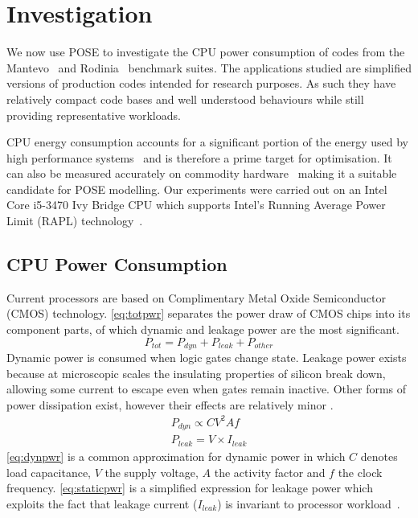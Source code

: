 \section{Investigation}
\label{sec:investigation}
We now use POSE to investigate the CPU power consumption of codes from the Mantevo~\cite{heroux:2009aa} and Rodinia~\cite{che:2009aa} benchmark suites.
The applications studied are simplified versions of production codes intended for research purposes.
As such they have relatively compact code bases and well understood behaviours while still providing representative workloads.

CPU energy consumption accounts for a significant portion of the energy used by high performance systems~\cite{rong:2010aa} and is therefore a prime target for optimisation.
It can also be measured accurately on commodity hardware~\cite{hackenberg:2013aa} making it a suitable candidate for POSE modelling.
Our experiments were carried out on an Intel Core i5-3470 Ivy Bridge CPU which supports Intel's Running Average Power Limit (RAPL) technology~\cite{david:2010aa}.

\subsection{CPU Power Consumption}
\label{ssec:cpupower}
Current processors are based on Complimentary Metal Oxide Semiconductor (CMOS) technology.
\autoref{eq:totpwr} separates the power draw of CMOS chips into its component parts, of which dynamic and leakage power are the most significant.
\begin{equation}
\label{eq:totpwr}
P_{tot} = P_{dyn} + P_{leak} + P_{other}
\end{equation}
Dynamic power is consumed when logic gates change state.
Leakage power exists because at microscopic scales the insulating properties of silicon break down, allowing some current to escape even when gates remain inactive.
Other forms of power dissipation exist, however their effects are relatively minor \cite{kaxiras:2008aa}.
\begin{gather}
P_{dyn} \propto CV^{2}Af \label{eq:dynpwr} \\
P_{leak} = V\times I_{leak} \label{eq:staticpwr}
\end{gather}
\autoref{eq:dynpwr} is a common approximation for dynamic power in which $C$ denotes load capacitance, $V$ the supply voltage, $A$ the activity factor and $f$ the clock frequency.
\autoref{eq:staticpwr} is a simplified expression for leakage power which exploits the fact that leakage current ($I_{leak}$) is invariant to processor workload~\cite{kim:2003aa}.

